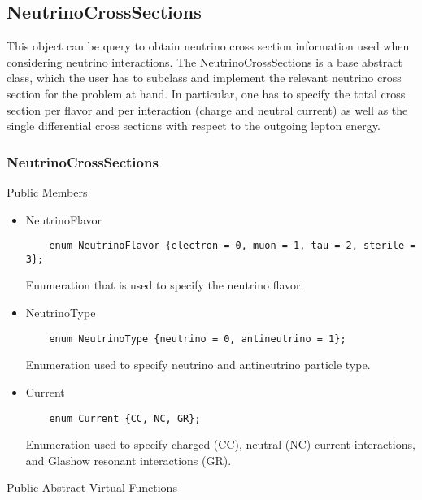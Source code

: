 \subsection{NeutrinoCrossSections}

This object can be query to obtain neutrino cross section information used when considering neutrino interactions. The {\ttf NeutrinoCrossSections} is a base abstract class, which the user has to subclass and implement the relevant neutrino cross section for the problem at hand. In particular, one has to specify the total cross section per flavor and per interaction (charge and neutral current) as well as the single differential cross sections with respect to the outgoing lepton energy.

\subsubsection{NeutrinoCrossSections}

{\underline Public Members}

\begin{itemize}
  \item {\ttf NeutrinoFlavor}
  \begin{lstlisting}
    enum NeutrinoFlavor {electron = 0, muon = 1, tau = 2, sterile = 3};
  \end{lstlisting}
  Enumeration that is used to specify the neutrino flavor.
  \item {\ttf NeutrinoType}
  \begin{lstlisting}
    enum NeutrinoType {neutrino = 0, antineutrino = 1};
  \end{lstlisting}
  Enumeration used to specify {\ttf neutrino} and {\ttf antineutrino} particle type.
  \item {\ttf Current}
  \begin{lstlisting}
    enum Current {CC, NC, GR};
  \end{lstlisting}
  Enumeration used to specify charged ({\ttf CC}), neutral ({\ttf NC}) current interactions, 
  and Glashow resonant interactions ({\ttf GR}).
\end{itemize}

{\underline Public Abstract Virtual Functions}

